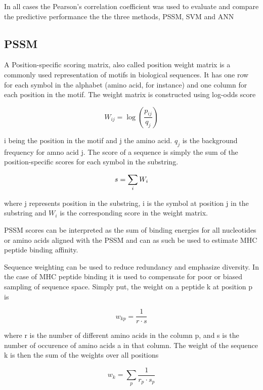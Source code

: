 
In all cases the Pearson's correlation coefficient was used to evaluate and compare the predictive performance the the three methods, PSSM, SVM and ANN

\subsection*{PSSM}
A Position-specific scoring matrix, also called position weight matrix is a commonly used representation of motifs in biological sequences. 
It has one row for each symbol in the alphabet (amino acid, for instance) and one column for each position in the motif.
The weight matrix is constructed using log-odds score

\begin{equation}
W_{ij} = \log{ (\frac{p_{ij}}{q_j}) }
\end{equation}

i being the position in the motif and j the amino acid. $q_j$ is the background frequency for amno acid j. 
The score of a sequence is simply the sum of the position-specific scores for each symbol in the substring.

\begin{equation}
s = \sum_{i}{W_{i}} \\
\end{equation}

where j represents position in the substring, i is the symbol at position j in the substring and $W_{i}$ is the corresponding score in the weight matrix.

PSSM scores can be interpreted as the sum of binding energies for all nucleotides or amino acids aligned with the PSSM and can as such be used to estimate MHC peptide binding affinity.

Sequence weighting can be used to reduce redundancy and emphasize diversity. In the case of MHC peptide binding it is used to compensate for poor or biased sampling of sequence space.
Simply put, the weight on a peptide k at position p is

\begin{equation}
w_{kp} = \frac{1}{r\cdot s}
\end{equation}

where r is the number of different amino acids in the column p, and s is the number of occurence of amino acids a in that column. The weight of the sequence k is then the sum of the weights over all positions

\begin{equation}
w_{k} = \sum_{p}{\frac{1}{r_p \cdot s_p}}
\end{equation}

